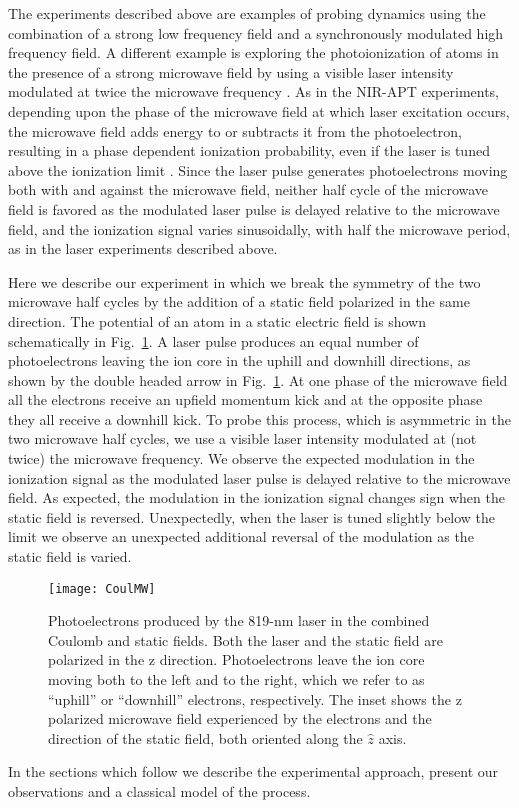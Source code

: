 \documentclass[aps,pra,reprint,groupedaddress]{revtex4-1}
\begin{document}
The experiments described above are examples of probing dynamics using the combination of a strong low frequency field and a synchronously modulated high frequency field. A different example is exploring the photoionization of atoms in the presence of a strong microwave field by using a visible laser intensity modulated at twice the microwave frequency \cite{Carrat}. As in the NIR-APT experiments, depending upon the phase of the microwave field at which laser excitation occurs, the microwave field adds energy to or subtracts it from the photoelectron, resulting in a phase dependent ionization probability, even if the laser is tuned above the ionization limit \cite{Shuman}. Since the laser pulse generates photoelectrons moving both with and against the microwave field, neither half cycle of the microwave field is favored as the modulated laser pulse is delayed relative to the microwave field, and the ionization signal varies sinusoidally, with half the microwave period, as in the laser experiments described above.

Here we describe our experiment in which we break the symmetry of the two microwave half cycles by the addition of a static field polarized in the same direction. The potential of an atom in a static electric field is shown schematically in Fig.~\ref{fig:CoulMW}. A laser pulse produces an equal number of photoelectrons leaving the ion core in the uphill and downhill directions, as shown by the double headed arrow in Fig.~\ref{fig:CoulMW}. At one phase of the microwave field all the electrons receive an upfield momentum kick and at the opposite phase they all receive a downhill kick. To probe this process, which is asymmetric in the two microwave half cycles, we use a visible laser intensity modulated at (not twice) the microwave frequency. We observe the expected modulation in the ionization signal as the modulated laser pulse is delayed relative to the microwave field. As expected, the modulation in the ionization signal changes sign when the static field is reversed. Unexpectedly, when the laser is tuned slightly below the limit we observe an unexpected additional reversal of the modulation as the static field is varied.

\begin{figure}
	\texttt{[image: CoulMW]}
	\caption{Photoelectrons produced by the 819-nm laser in the combined Coulomb and static fields. Both the laser and the static field are polarized in the z direction. Photoelectrons leave the ion core moving both to the left and to the right, which we refer to as ``uphill'' or ``downhill'' electrons, respectively. The inset shows the z polarized microwave field experienced by the electrons and the direction of the static field, both oriented along the $\hat{z}$ axis.}
	\label{fig:CoulMW}
\end{figure}
In the sections which follow we describe the experimental approach, present our observations and a classical model of the process.
\end{document}
